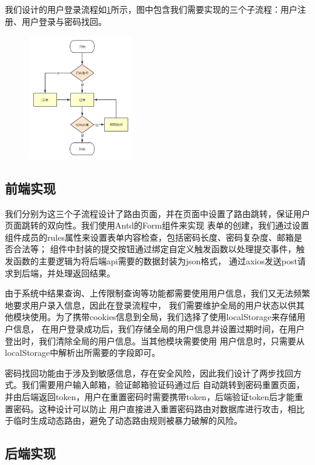 我们设计的用户登录流程如\ref{fig:login-process}所示，图中包含我们需要实现的三个子流程：用户注册、用户登录与密码找回。
\begin{figure}[ht]
    \centering
    \includegraphics[width=0.4\textwidth]{source/img/login_process.png}
    \label{fig:login-process}
\end{figure}

\subsection{前端实现}

我们分别为这三个子流程设计了路由页面，并在页面中设置了路由跳转，保证用户页面跳转的双向性。我们使用Antd的Form组件来实现
表单的创建，我们通过设置组件成员的rules属性来设置表单内容检查，包括密码长度、密码复杂度、邮箱是否合法等；
组件中封装的提交按钮通过绑定自定义触发函数以处理提交事件，触发函数的主要逻辑为将后端api需要的数据封装为json格式，
通过axios发送post请求到后端，并处理返回结果。

由于系统中结果查询、上传限制查询等功能都需要使用用户信息，我们又无法频繁地要求用户录入信息，因此在登录流程中，
我们需要维护全局的用户状态以供其他模块使用。为了携带cookies信息到全局，我们选择了使用localStorage来存储用户信息，
在用户登录成功后，我们存储全局的用户信息并设置过期时间，在用户登出时，我们清除全局的用户信息。当其他模块需要使用
用户信息时，只需要从localStorage中解析出所需要的字段即可。

密码找回功能由于涉及到敏感信息，存在安全风险，因此我们设计了两步找回方式。我们需要用户输入邮箱，验证邮箱验证码通过后
自动跳转到密码重置页面，并由后端返回token，用户在重置密码时需要携带token，后端验证token后才能重置密码。这种设计可以防止
用户直接进入重置密码路由对数据库进行攻击，相比于临时生成动态路由，避免了动态路由规则被暴力破解的风险。

\subsection{后端实现}

